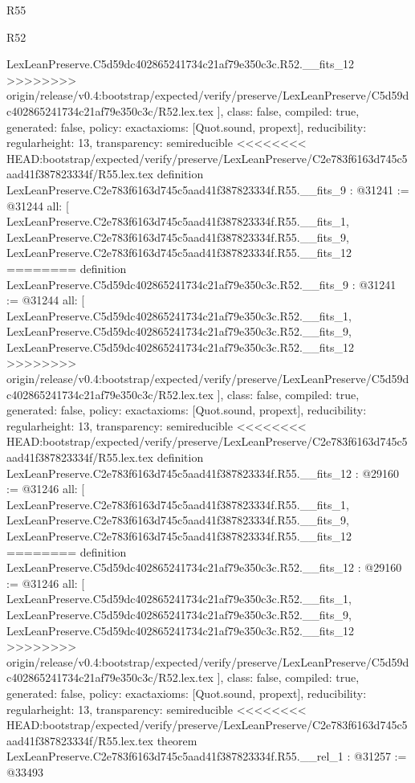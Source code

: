 \begin{lexlean}{R55}
\begin{lexlean}{R52}
\begin{coremodule}
{{{{{{{{{{{{{{{{{{{{{{{{{{{{{{{{{{{{{{{{{{{{{{{{{{{{{{{{{{{{{{{{{{{{{{{{{{{{{{{{{{{{{{{{{{{{{{{{{{{{{{{{{{{{{{{{{{{{{{{{{{{{{{{{{{{{{{{{{{{{{{{{{{{{{{    LexLeanPreserve.C5d59dc402865241734c21af79e350c3c.R52.__fits_12
>>>>>>>> origin/release/v0.4:bootstrap/expected/verify/preserve/LexLeanPreserve/C5d59dc402865241734c21af79e350c3c/R52.lex.tex
  ],
  class: false,
  compiled: true,
  generated: false,
  policy: exact{axioms: [Quot.sound, propext]},
  reducibility: regular{height: 13},
  transparency: semireducible
}
<<<<<<<< HEAD:bootstrap/expected/verify/preserve/LexLeanPreserve/C2e783f6163d745c5aad41f387823334f/R55.lex.tex
definition LexLeanPreserve.C2e783f6163d745c5aad41f387823334f.R55.__fits_9 : @31241 := @31244 {
  all: [
    LexLeanPreserve.C2e783f6163d745c5aad41f387823334f.R55.__fits_1,
    LexLeanPreserve.C2e783f6163d745c5aad41f387823334f.R55.__fits_9,
    LexLeanPreserve.C2e783f6163d745c5aad41f387823334f.R55.__fits_12
========
definition LexLeanPreserve.C5d59dc402865241734c21af79e350c3c.R52.__fits_9 : @31241 := @31244 {
  all: [
    LexLeanPreserve.C5d59dc402865241734c21af79e350c3c.R52.__fits_1,
    LexLeanPreserve.C5d59dc402865241734c21af79e350c3c.R52.__fits_9,
    LexLeanPreserve.C5d59dc402865241734c21af79e350c3c.R52.__fits_12
>>>>>>>> origin/release/v0.4:bootstrap/expected/verify/preserve/LexLeanPreserve/C5d59dc402865241734c21af79e350c3c/R52.lex.tex
  ],
  class: false,
  compiled: true,
  generated: false,
  policy: exact{axioms: [Quot.sound, propext]},
  reducibility: regular{height: 13},
  transparency: semireducible
}
<<<<<<<< HEAD:bootstrap/expected/verify/preserve/LexLeanPreserve/C2e783f6163d745c5aad41f387823334f/R55.lex.tex
definition LexLeanPreserve.C2e783f6163d745c5aad41f387823334f.R55.__fits_12 : @29160 := @31246 {
  all: [
    LexLeanPreserve.C2e783f6163d745c5aad41f387823334f.R55.__fits_1,
    LexLeanPreserve.C2e783f6163d745c5aad41f387823334f.R55.__fits_9,
    LexLeanPreserve.C2e783f6163d745c5aad41f387823334f.R55.__fits_12
========
definition LexLeanPreserve.C5d59dc402865241734c21af79e350c3c.R52.__fits_12 : @29160 := @31246 {
  all: [
    LexLeanPreserve.C5d59dc402865241734c21af79e350c3c.R52.__fits_1,
    LexLeanPreserve.C5d59dc402865241734c21af79e350c3c.R52.__fits_9,
    LexLeanPreserve.C5d59dc402865241734c21af79e350c3c.R52.__fits_12
>>>>>>>> origin/release/v0.4:bootstrap/expected/verify/preserve/LexLeanPreserve/C5d59dc402865241734c21af79e350c3c/R52.lex.tex
  ],
  class: false,
  compiled: true,
  generated: false,
  policy: exact{axioms: [Quot.sound, propext]},
  reducibility: regular{height: 13},
  transparency: semireducible
}
<<<<<<<< HEAD:bootstrap/expected/verify/preserve/LexLeanPreserve/C2e783f6163d745c5aad41f387823334f/R55.lex.tex
theorem LexLeanPreserve.C2e783f6163d745c5aad41f387823334f.R55.__rel_1 : @31257 := @33493 {
}}}}}}}}}}}}}}}}}}}}}}}}}}}}}}}}}}}}}}}}}}}}}}}}}}}}}}}}}}}}}}}}}}}}}}}}}}}}}}}}}}}}}}}}}}}}}}}}}}}}}}}}}}}}}}}}}}}}}}}}}}}}}}}}}}}}}}}}}}}}}}}}}}}}}}}}
\end{coremodule}
\end{lexlean}
\end{lexlean}
